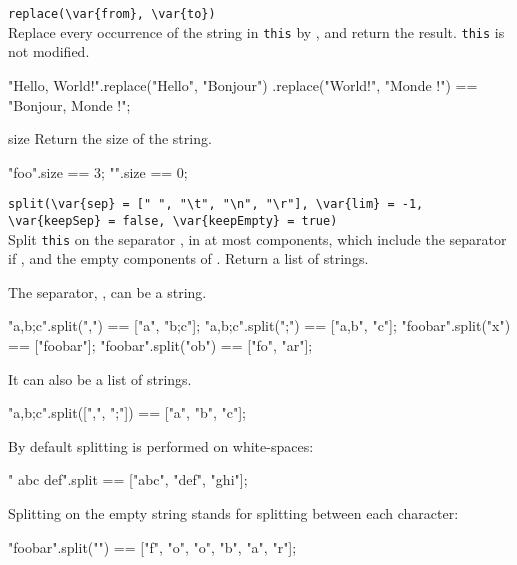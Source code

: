 \begin{urbiscriptapi}
\item \lstinline|replace(\var{from}, \var{to})|\\
  Replace every occurrence of the string  in
  \lstinline|this| by , and return the result.
  \lstinline|this| is not modified.
\begin{urbiassert}
"Hello, World!".replace("Hello", "Bonjour")
                      .replace("World!", "Monde !") ==
       "Bonjour, Monde !";
\end{urbiassert}

\item[size]
  Return the size of the string.
\begin{urbiassert}
"foo".size == 3;
"".size == 0;
\end{urbiassert}

\item \lstinline|split(\var{sep} = [" ", "\t", "\n", "\r"], \var{lim} = -1, \var{keepSep} = false, \var{keepEmpty} = true)|\\
  Split \lstinline|this| on the separator , in at most 
  components, which include the separator if , and the
  empty components of .  Return a list of strings.

  The separator, , can be a string.

\begin{urbiassert}
       "a,b;c".split(",") == ["a", "b;c"];
       "a,b;c".split(";") == ["a,b", "c"];
      "foobar".split("x") == ["foobar"];
     "foobar".split("ob") == ["fo", "ar"];
\end{urbiassert}

\noindent
It can also be a list of strings.

\begin{urbiassert}
"a,b;c".split([",", ";"]) == ["a", "b", "c"];
\end{urbiassert}

\noindent
By default splitting is performed on white-spaces:

\begin{urbiassert}
"  abc  def\tghi\n".split == ["abc", "def", "ghi"];
\end{urbiassert}

\noindent
Splitting on the empty string stands for splitting between each character:

\begin{urbiassert}
"foobar".split("") == ["f", "o", "o", "b", "a", "r"];
\end{urbiassert}


\end{urbiscriptapi}
